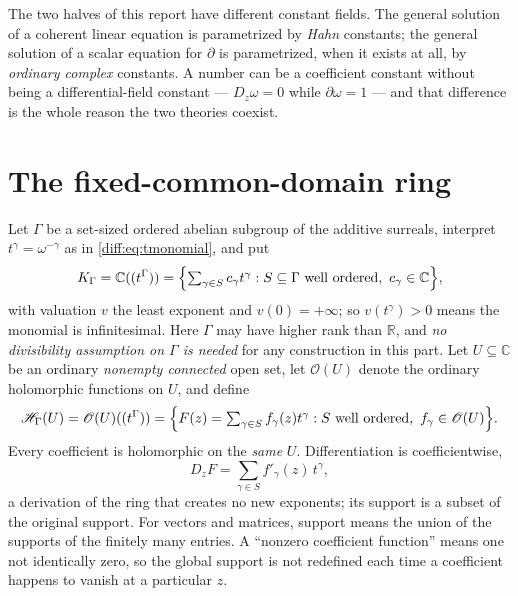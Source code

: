 \documentclass[11pt,letterpaper]{article}
\numberwithin{equation}{section}
\theoremstyle{definition}
\theoremstyle{remark}
\newcommand{\R}{\mathbb R}
\newcommand{\C}{\mathbb C}
\newcommand{\der}{\partial}
\newcommand{\Hring}{\mathscr H}
\newcommand{\Hol}{\mathscr O}
\newcommand{\Dz}{D_{z}}
\begin{document}
The two halves of this report have different constant fields. The general
solution of a coherent linear equation is parametrized by \emph{Hahn}
constants; the general solution of a scalar equation for $\der$ is
parametrized, when it exists at all, by \emph{ordinary complex} constants. A
number can be a coefficient constant without being a differential-field
constant --- $\Dz\omega=0$ while $\der\omega=1$ --- and that difference is the
whole reason the two theories coexist.

\section{The fixed-common-domain ring}
\label{diff:sec:coherentring}

Let $\Gamma$ be a set-sized ordered abelian subgroup of the additive surreals,
interpret $t^{\gamma}=\omega^{-\gamma}$ as in \cref{diff:eq:tmonomial}, and put
\[
 K_{\Gamma}=\C((t^{\Gamma}))
 =\Bigl\{\textstyle\sum_{\gamma\in S}c_{\gamma}t^{\gamma}:
 S\subseteq\Gamma\text{ well ordered},\ c_{\gamma}\in\C\Bigr\},
\]
with valuation $v$ the least exponent and $v(0)=+\infty$; so $v(t^{\gamma})>0$
means the monomial is infinitesimal. Here $\Gamma$ may have higher rank than
$\R$, and \emph{no divisibility assumption on $\Gamma$ is needed} for any
construction in this part. Let $U\subseteq\C$ be an ordinary \emph{nonempty connected}
open set, let $\Hol(U)$ denote the ordinary holomorphic functions on $U$, and
define
\begin{equation}\label{diff:eq:coherentring}
 \Hring_{\Gamma}(U)=\Hol(U)((t^{\Gamma}))
 =\Bigl\{F(z)=\textstyle\sum_{\gamma\in S}f_{\gamma}(z)t^{\gamma}:
 S\text{ well ordered},\ f_{\gamma}\in\Hol(U)\Bigr\}.
\end{equation}
Every coefficient is holomorphic on the \emph{same} $U$. Differentiation is
coefficientwise,
\[
 \Dz F=\sum_{\gamma\in S}f'_{\gamma}(z)\,t^{\gamma},
\]
a derivation of the ring that creates no new exponents; its support is a
subset of the original support. For vectors and matrices, support means the
union of the supports of the finitely many entries. A ``nonzero coefficient
function'' means one not identically zero, so the global support is not
redefined each time a coefficient happens to vanish at a particular $z$.
\end{document}
